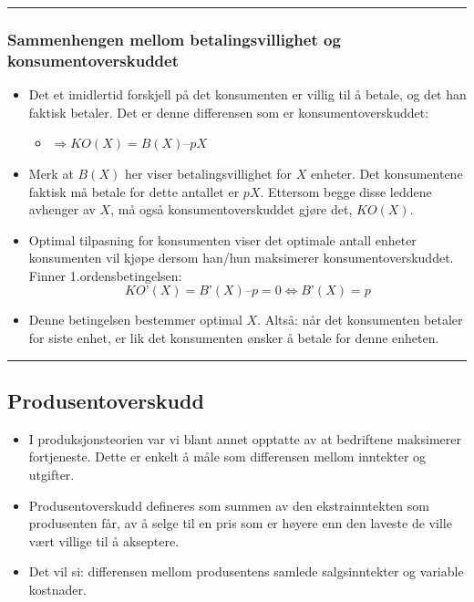 \documentclass[
  letterpaper,
  DIV=11,
  numbers=noendperiod]{scrartcl}
\providecommand{\tightlist}{%
  \setlength{\itemsep}{0pt}\setlength{\parskip}{0pt}}\usepackage{longtable,booktabs,array}
\begin{document}
\begin{center}\rule{0.5\linewidth}{0.5pt}\end{center}

\subsubsection{Sammenhengen mellom betalingsvillighet og
konsumentoverskuddet}\label{sammenhengen-mellom-betalingsvillighet-og-konsumentoverskuddet}

\begin{itemize}
\tightlist
\item
  Det et imidlertid forskjell på det konsumenten er villig til å betale,
  og det han faktisk betaler. Det er denne differensen som er
  konsumentoverskuddet:

  \begin{itemize}
  \tightlist
  \item
    \(\Rightarrow KO(X) = B(X) – pX\)
  \end{itemize}
\item
  Merk at \(B(X)\) her viser betalingsvillighet for \(X\) enheter. Det
  konsumentene faktisk må betale for dette antallet er \(pX\). Ettersom
  begge disse leddene avhenger av \(X\), må også konsumentoverskuddet
  gjøre det, \(KO(X)\).
\item
  Optimal tilpasning for konsumenten viser det optimale antall enheter
  konsumenten vil kjøpe dersom han/hun maksimerer konsumentoverskuddet.
  Finner 1.ordensbetingelsen: \begin{equation*}
  KO’(X) = B’(X) – p = 0 \Leftrightarrow B’(X) = p
  \end{equation*}
\item
  Denne betingelsen bestemmer optimal \(X\). Altså: når det konsumenten
  betaler for siste enhet, er lik det konsumenten ønsker å betale for
  denne enheten.
\end{itemize}

\begin{center}\rule{0.5\linewidth}{0.5pt}\end{center}

\subsection{Produsentoverskudd}\label{produsentoverskudd-1}

\begin{itemize}
\tightlist
\item
  I produksjonsteorien var vi blant annet opptatte av at bedriftene
  maksimerer fortjeneste. Dette er enkelt å måle som differensen mellom
  inntekter og utgifter.
\item
  Produsentoverskudd defineres som summen av den ekstrainntekten som
  produsenten får, av å selge til en pris som er høyere enn den laveste
  de ville vært villige til å akseptere.
\item
  Det vil si: differensen mellom produsentens samlede salgsinntekter og
  variable kostnader.
\end{itemize}
\end{document}
